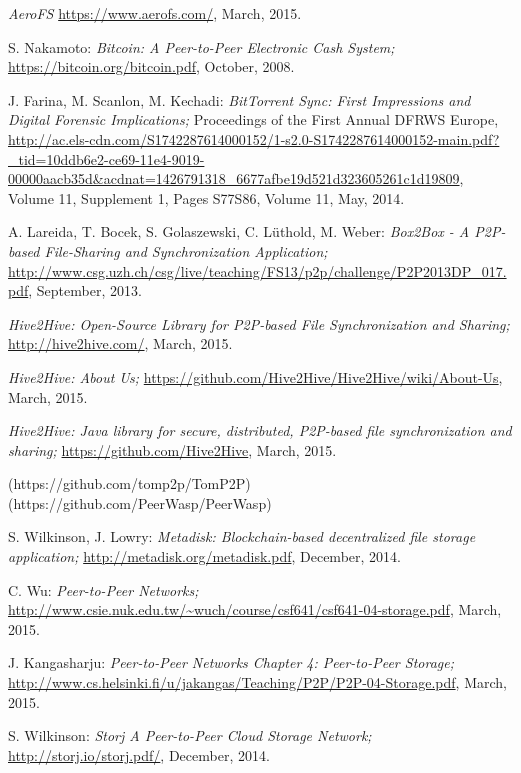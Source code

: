 \begin{thebibliography}{99}
		\emph{AeroFS}
		\url{https://www.aerofs.com/},
		March, 2015.

		S. Nakamoto:
		\emph{Bitcoin: A Peer-to-Peer Electronic Cash System;}
		\url{https://bitcoin.org/bitcoin.pdf},
		October, 2008.

		J. Farina, M. Scanlon, M. Kechadi:
		\emph{BitTorrent Sync: First Impressions and Digital Forensic Implications;}
		Proceedings of the First Annual DFRWS Europe,
		\url{http://ac.els-cdn.com/S1742287614000152/1-s2.0-S1742287614000152-main.pdf?_tid=10ddb6e2-ce69-11e4-9019-00000aacb35d&acdnat=1426791318_6677afbe19d521d323605261c1d19809},
		Volume 11, Supplement 1, Pages S77\textendash S86, Volume 11, May, 2014.

		A. Lareida, T. Bocek, S. Golaszewski, C. L\"uthold, M. Weber:
		\emph{Box2Box - A P2P-based File-Sharing and Synchronization Application;}
		\url{http://www.csg.uzh.ch/csg/live/teaching/FS13/p2p/challenge/P2P2013DP_017.pdf},
		September, 2013.

		\emph{Hive2Hive: Open-Source Library for P2P-based File Synchronization and Sharing;}
		\url{http://hive2hive.com/},
		March, 2015.

		\emph{Hive2Hive: About Us;}
		\url{https://github.com/Hive2Hive/Hive2Hive/wiki/About-Us},
		March, 2015.

		\emph{Hive2Hive: Java library for secure, distributed, P2P-based file synchronization and sharing;}
		\url{https://github.com/Hive2Hive},
		March, 2015.

	(https://github.com/tomp2p/TomP2P) (https://github.com/PeerWasp/PeerWasp)

		S. Wilkinson, J. Lowry:
		\emph{Metadisk: Blockchain-based decentralized file storage application;}
		\url{http://metadisk.org/metadisk.pdf},
		December, 2014.

		C. Wu:
		\emph{Peer-to-Peer Networks;}
		\url{http://www.csie.nuk.edu.tw/~wuch/course/csf641/csf641-04-storage.pdf},
		March, 2015.

		J. Kangasharju:
		\emph{Peer-to-Peer Networks Chapter 4: Peer-to-Peer Storage;}
		\url{http://www.cs.helsinki.fi/u/jakangas/Teaching/P2P/P2P-04-Storage.pdf},
		March, 2015.

		S. Wilkinson:
		\emph{Storj A Peer-to-Peer Cloud Storage Network;}
		\url{http://storj.io/storj.pdf/},
		December, 2014.


\end{thebibliography}
